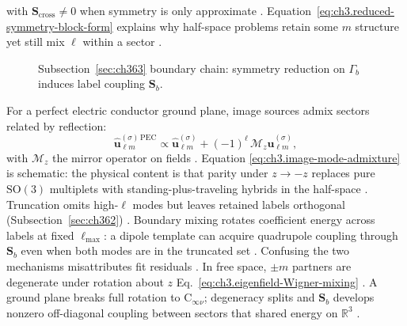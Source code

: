 with \(\mathbf{S}_{\mathrm{cross}}\neq0\) when symmetry is only approximate \cite{jackson1999}.
Equation~\eqref{eq:ch3.reduced-symmetry-block-form} explains why half-space problems retain some \(m\) structure yet
still mix \(\ell\) within a sector \cite{stratton1941}.
\begin{figure}[t]
\centering
{}
\caption{Subsection~\ref{sec:ch363} boundary chain: symmetry reduction on \(\Gamma_{b}\) induces label coupling
\(\mathbf{S}_{b}\).}
\label{fig:ch3.363-boundary-mixing-chain}
\end{figure}
For a perfect electric conductor ground plane, image sources admix sectors related by reflection:
\begin{equation}
\label{eq:ch3.image-mode-admixture}
\widehat{\mathbf{u}}_{\ell m}^{(\sigma)\,\mathrm{PEC}}
\propto
\widehat{\mathbf{u}}_{\ell m}^{(\sigma)}+(-1)^{\ell}\,\mathcal{M}_{z}\widehat{\mathbf{u}}_{\ell m}^{(\sigma)},
\end{equation}
with \(\mathcal{M}_{z}\) the mirror operator on fields \cite{jackson1999}. Equation
\eqref{eq:ch3.image-mode-admixture} is schematic: the physical content is that parity under \(z\to -z\) replaces
pure \(\mathrm{SO}(3)\) multiplets with standing-plus-traveling hybrids in the half-space \cite{harrington2001}.
Truncation omits high-\(\ell\) modes but leaves retained labels orthogonal
(Subsection~\ref{sec:ch362}) \cite{hansen1988}. Boundary mixing rotates coefficient energy across labels at fixed
\(\ell_{\max}\): a dipole template can acquire quadrupole coupling through \(\mathbf{S}_{b}\) even when both modes are
in the truncated set \cite{harrington2001}. Confusing the two mechanisms misattributes fit residuals
\cite{harrington2001}.
In free space, \(\pm m\) partners are degenerate under rotation about \(z\)
Eq.~\eqref{eq:ch3.eigenfield-Wigner-mixing} \cite{jackson1999}. A ground plane breaks full rotation to
\(\mathrm{C}_{\infty\nu}\); degeneracy splits and \(\mathbf{S}_{b}\) develops nonzero off-diagonal coupling between
sectors that shared energy on \(\mathbb{R}^{3}\) \cite{stratton1941}.

